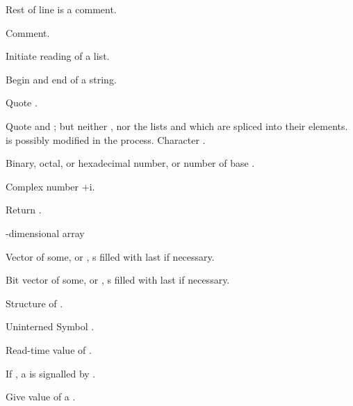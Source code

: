 \begin{LIST}{1cm}

  {
  Rest of line is a comment.
  }

  {
  Comment.
  }

  \IT{\KWD*{(}}
  {
  Initiate reading of a list.
  }

  {
  Begin and end of a string.
  }

  {Quote .}

  {
  Quote  and ; but neither , nor the lists
   and  which are spliced into their
  elements.  is possibly modified in the process.
  }
  {
  Character .
  }

  {
  Binary, octal, or hexadecimal number, or number of base . 
  }

  {Complex number $+$i.
  }

  {
  Return .
  }

  {
  -dimensional array
  }

  {
  \index{\#(}%
  Vector of some, or ,
  s filled with last  if necessary.
  }

  {
  \index{\#*}%
  Bit vector of some, or ,
  s filled with last  if necessary.
  }

  {
  Structure of .
  }

  {
  Uninterned Symbol .
  }

  {
  Read-time value of .
  }

  {
  If \NIL, a  is signalled by .
  }

  {
  \index{\#=}%
  Give value of  a .
  }


\end{LIST}
